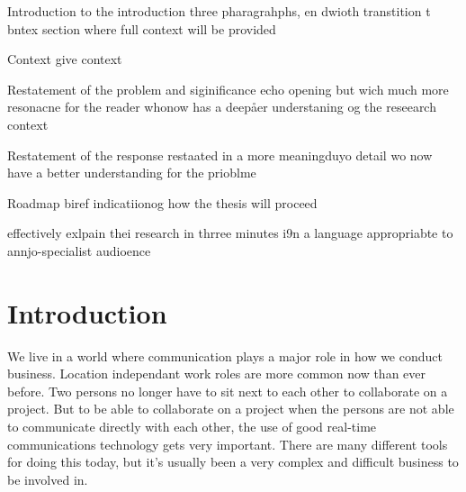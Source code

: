 Introduction to the introduction
three pharagrahphs, en dwioth transtition t bntex section
 where full context will be provided


Context
give context 


Restatement of the problem
and siginificance
echo opening but wich much more resonacne for the reader whonow has a deepåer understaning og the reseearch context


Restatement of the response
restaated in  a more meaningduyo detail wo now have a better understanding for the prioblme

Roadmap
biref indicatiionog how the thesis will proceed


effectively exlpain thei research in thrree minutes i9n a language appropriabte to annjo-specialist audioence


\section{Introduction}
We live in a world where communication plays a major role in how we conduct business. Location independant work roles are more common now than ever before. Two persons no longer have to sit next to each other to collaborate on a project. But to be able to collaborate on a project when the persons are not able to communicate directly with each other, the use of good real-time communications technology gets very important. There are many different tools for doing this today, but it's usually been a very complex and difficult business to be involved in.


